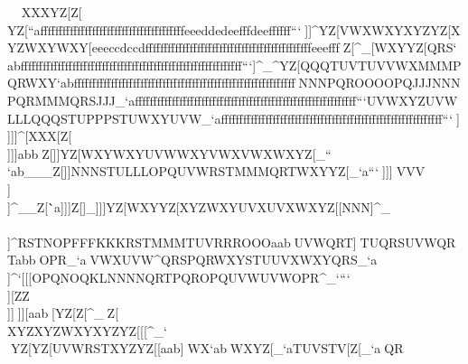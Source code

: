        XXXYZ[Z[\[\]YZ[``afffffffffffffffffffffffffffffffffffffffeeeddedeefffdeeffffff```^^_]]^YZ[VWXWXYXYZYZ[XYZWXYWXY[\]eeeccdccdfffffffffffffffffffffffffffffffffffffffffffffeeefff^^^Z[\XYZVWXUVWWXYUVXWXYXYZYZ[WXY\]^ffffffffffffffffffdeecdedeeddeeeefffdeedeedeefffffffffffffff```RRRTTTPPPMNPXYZXYZOOOQRSJJJPPP`abffffffffffffffffffffffffffffffffffffffffffffffffffffffffffff___XYZSTUSTUOPR[\]]^_[\]WXYYZ[QRS`abffffffffffffffffffffffffffffffffffffffffffffffffffffffffffff```]^_\]^YZ[QQQTUVTUVVWXMMMPQRWXY`abffffffffffffffffffffffffffffffffffffffffffffffffffffffffffff^^^NNNPQROOOOPQJJJNNNPQRMMMQRSJJJ_`affffffffffffffffffffffffffffffffffffffffffffffffffffffffffff```UVWXYZUVWLLLQQQSTUPPPSTUWXYUVW_`affffffffffffffffffffffffffffffffffffffffffffffffffffffffffff```^^_\]]\]]]]^[\]XXX[\]Z[\\]]\]]abb                                                            ^^^Z[\XYZXYZYZ[XYZXYZWXYYZ[XYZYZ[[\]                                                            ]]]YZ[WXYWXYUVWWXYVWXVWXWXYZ[\WXY_``                                                            \\\MNPUWXNOPOPRQRTSTVNNNUVXSTUWXY`ab                                                            ___Z[\QRTYZ[_`aYZ[VWXOQR^__``aYZ[`ab                                                            ___XYZSTUWXYPPPRRRWXYOOOPQSOPRRST_`a                                                            ^^^QRSVWXUVWWXYXYZVWXVWXQRTUVWPQR`ab                                                            ]]]NNNSTULLLOPQUVWRSTMMMQRTWXYYZ[_`a                                                            ```^^_\]]\]]]^^[\]VVV\\]\\]^__Z[\``a                                                            ]]]Z[\XYZYZ[YZ[ZZ[YZ[WXYXYZYZ[XYZ]]_                                                            ]]]YZ[WXYYZ[XYZWXYUVXUVXWXYZ[[NNN]^_                                                            \\\\]^RSTNOPFFFKKKRSTMMMTUVRRROOOaab                                                            ^^^UVWQRT]^^STUQRSUVWQRTabb^^_OPR_`a                                                            ^^^VWXUVW\]^QRSPQRWXYSTUUVXWXYQRS_`a                                                            \\\NOQWXYSTUQSTXYZUVWWXYXYZUVWOPR]^`                                                            [[[OPQNOQKLNNNNQRTPQROPQUVWUVWOPR^_`                                                            ```^^_\\][\]ZZ\ZZ\XXX\\]]^^\]][\]aab                                                            ^^^[\]YZ[Z[\YZ[Z[\YZ[WXYXYZWXYVWX]^_                                                            ^^^Z[\[\]XYZXYZWXYXYZYZ[[[\XYZVWX^_`                                                            \\\PQSJJJLNOLMNLMOTUWTUWOOORRRLLLabb                                                            ^^^YZ[YZ[UVWRSTXYZYZ[[\]aab]^^VWX`ab                                                            ^^^WXYZ[\_`aTUVSTV[\]Z[\UVWUVWRSU_`a                                                            ^^^QR